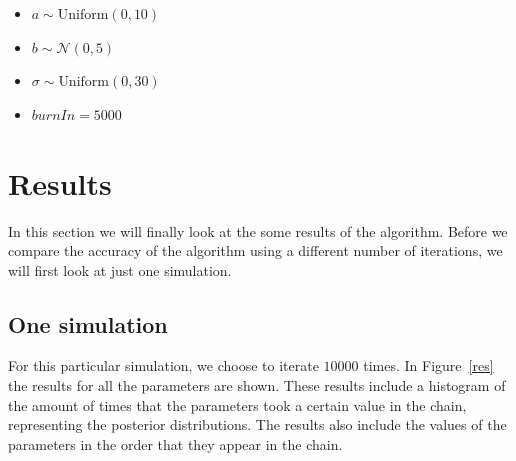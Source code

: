 \documentclass[a4paper,10pt]{article}\usepackage[]{graphicx}\usepackage[]{color}
\begin{document}
\begin{itemize}
  \item $a \sim \text{Uniform}(0,10)$
  \item $b \sim \mathcal{N}(0,5)$
  \item $\sigma \sim \text{Uniform}(0,30)$
  \item $burnIn = 5000$
\end{itemize}

\newpage
\section{Results}\label{Res}

In this section we will finally look at the some results of the algorithm. Before we compare the accuracy of the algorithm using a different number of iterations, we will first look at just one simulation. 

\subsection{One simulation}

For this particular simulation, we choose to iterate $10000$ times. In Figure~\ref{res} the results for all the parameters are shown. These results include a histogram of the amount of times that the parameters took a certain value in the chain, representing the posterior distributions. The results also include the values of the parameters in the order that they appear in the chain.
\end{document}
